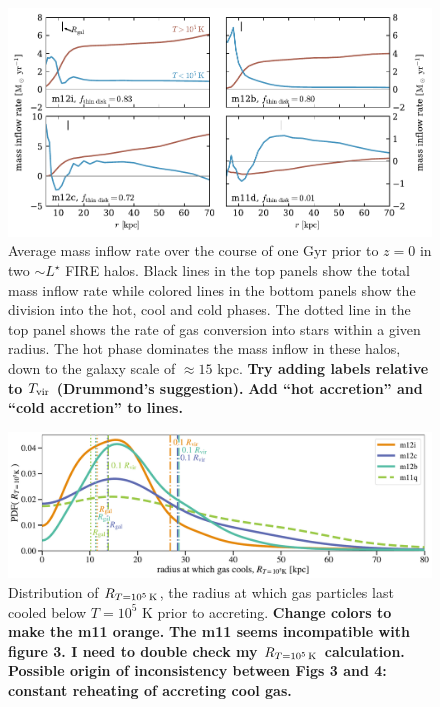 \documentclass[fleqn,usenatbib]{mnras}
\newcommand{\Rcon}{R_{T=10^5\,{\rm K}}}
\begin{document}
\begin{figure}
    \centering
    \includegraphics{figures/Mdot.pdf}
    \caption{
    Average mass inflow rate over the course of one Gyr prior to $z=0$ in two $\sim L^\star$ FIRE halos.
    Black lines in the top panels show the total mass inflow rate while colored lines in the bottom panels show the division into the hot, cool and cold phases.
    The dotted line in the top panel shows the rate of gas conversion into stars within a given radius.
    The hot phase dominates the mass inflow in these halos, down to the galaxy scale of $\approx15$ kpc.
    \textbf{Try adding labels relative to $T_{\rm vir}$ (Drummond's suggestion).}
    \textbf{Add ``hot accretion'' and ``cold accretion'' to lines.}
    }
    \label{f: Mdot}
\end{figure}

\begin{figure}
    \centering
    \includegraphics[width=\textwidth]{figures/R1e5K.pdf}
    \caption{
    Distribution of $\Rcon$, the radius at which gas particles last cooled below $T=10^5$ K prior to accreting.
    \textbf{Change colors to make the m11 orange.}
    \textbf{The m11 seems incompatible with figure 3. I need to double check my $\Rcon$ calculation.}
    \textbf{Possible origin of inconsistency between Figs 3 and 4: constant reheating of accreting cool gas.}
    }
    \label{f: R1e5K}
\end{figure}
\end{document}
